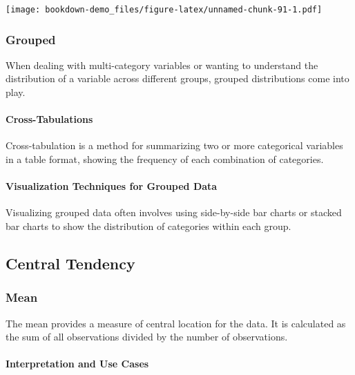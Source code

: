 \documentclass[
  b5paper]{book}
\begin{document}
\texttt{[image: bookdown-demo\_files/figure-latex/unnamed-chunk-91-1.pdf]}

\hypertarget{grouped}{%
\subsubsection{Grouped}\label{grouped}}

When dealing with multi-category variables or wanting to understand the distribution of a variable across different groups, grouped distributions come into play.

\hypertarget{cross-tabulations}{%
\paragraph{Cross-Tabulations}\label{cross-tabulations}}

Cross-tabulation is a method for summarizing two or more categorical variables in a table format, showing the frequency of each combination of categories.

\hypertarget{visualization-techniques-for-grouped-data}{%
\paragraph{Visualization Techniques for Grouped Data}\label{visualization-techniques-for-grouped-data}}

Visualizing grouped data often involves using side-by-side bar charts or stacked bar charts to show the distribution of categories within each group.

\hypertarget{central-tendency}{%
\subsection{Central Tendency}\label{central-tendency}}

\hypertarget{mean}{%
\subsubsection{Mean}\label{mean}}

The mean provides a measure of central location for the data. It is calculated as the sum of all observations divided by the number of observations.

\hypertarget{interpretation-and-use-cases}{%
\paragraph{Interpretation and Use Cases}\label{interpretation-and-use-cases}}
\end{document}
